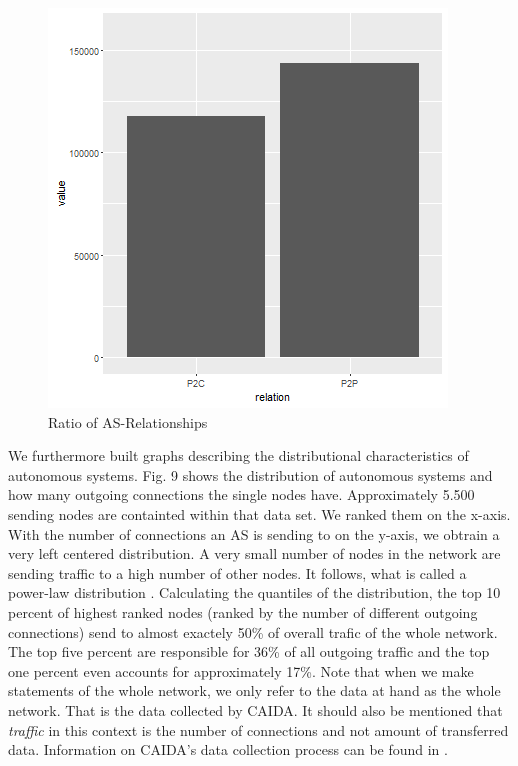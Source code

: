 \documentclass[conference, 11pt]{IEEEtran}
\begin{document}
\vspace{0.5cm}
\begin{figure}[htbp]
\centerline{\includegraphics[scale=0.45]{Graphics/relationspeerandprovider.png}}
\caption{Ratio of AS-Relationships }
\label{fig}
\end{figure}
\vspace{0.5cm}

We furthermore built graphs describing the distributional characteristics of autonomous systems. Fig. 9 shows the distribution of autonomous systems and how many outgoing connections the single nodes have. Approximately 5.500 sending nodes are containted within that data set. We ranked them on the x-axis. With the number of connections an AS is sending to on the y-axis, we obtrain a very left centered distribution. A very small number of nodes in the network are sending traffic to a high number of other nodes. It follows, what is called a power-law distribution  \cite{powerlawCitation}. Calculating the quantiles of the distribution, the top 10 percent of highest ranked nodes (ranked by the number of different outgoing connections) send to almost exactely 50\% of overall trafic of the whole network. The top five percent are responsible for 36\% of all outgoing traffic and the top one percent even accounts for approximately 17\%. Note that when we make statements of the whole network, we only refer to the data at hand as the whole network. That is the data collected by CAIDA. It should also be mentioned that \textit{traffic} in this context is the number of connections and not amount of transferred data. Information on CAIDA's data collection process can be found in \cite{CaidaDataCollection} . 
\end{document}
